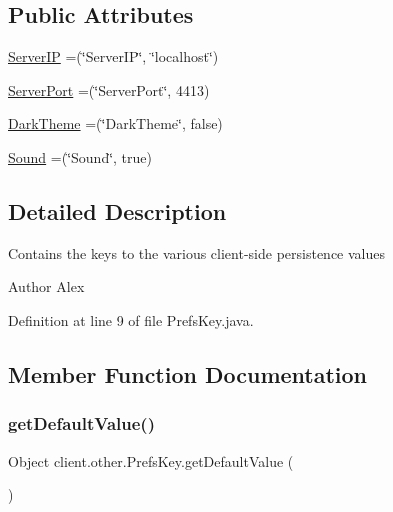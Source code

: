 \subsection*{Public Attributes}
\begin{DoxyCompactItemize}
\item 
\hyperlink{enumclient_1_1other_1_1_prefs_key_afb3297cc8cba1e49ec031c14e115feb8}{Server\+IP} =(\char`\"{}Server\+IP\char`\"{}, \char`\"{}localhost\char`\"{})
\item 
\hyperlink{enumclient_1_1other_1_1_prefs_key_a967610c3389ceac5034551d3f69c564c}{Server\+Port} =(\char`\"{}Server\+Port\char`\"{}, 4413)
\item 
\hyperlink{enumclient_1_1other_1_1_prefs_key_a1712884dcd2b70030aa4e9baadfc5d65}{Dark\+Theme} =(\char`\"{}Dark\+Theme\char`\"{}, false)
\item 
\hyperlink{enumclient_1_1other_1_1_prefs_key_a8ad253d1a3c77e65df307909afb7f52f}{Sound} =(\char`\"{}Sound\char`\"{}, true)
\end{DoxyCompactItemize}


\subsection{Detailed Description}
Contains the keys to the various client-\/side persistence values \begin{DoxyAuthor}{Author}
Alex 
\end{DoxyAuthor}


Definition at line 9 of file Prefs\+Key.\+java.



\subsection{Member Function Documentation}
\hypertarget{enumclient_1_1other_1_1_prefs_key_a7d50bec7ffef68ca2b9657cc4a8b271f}{}\label{enumclient_1_1other_1_1_prefs_key_a7d50bec7ffef68ca2b9657cc4a8b271f} 
\subsubsection{\texorpdfstring{get\+Default\+Value()}{getDefaultValue()}}
{\footnotesize\ttfamily Object client.\+other.\+Prefs\+Key.\+get\+Default\+Value (\begin{DoxyParamCaption}{ }\end{DoxyParamCaption})}



